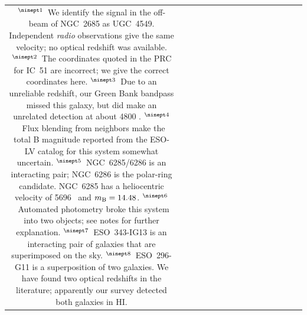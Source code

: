 \begin{tabular}{|c|l|ll|rr|lr|lr|r|rl|c|rr|}
{{$^{\ninept 1}$\ We identify the signal in the off-beam of NGC~2685 as  
	UGC~4549.  Independent {\it radio\/} observations give the 
	same velocity; no optical redshift was available.  \hfil\break
$^{\ninept 2}$\ The coordinates quoted in the PRC for IC~51 are incorrect; 
      we give the correct coordinates here.\hfil\break
$^{\ninept 3}$\ Due to an unreliable redshift, our Green Bank bandpass 
	missed this galaxy, but did make an unrelated detection at 
	about 4800 \KMS.  
	\hfil\break
$^{\ninept 4}$\ Flux blending from neighbors make the total B magnitude 
	reported from the ESO-LV catalog for this system somewhat uncertain.  
	\hfil\break
$^{\ninept 5}$\ NGC~6285/6286 is an interacting pair; NGC~6286 is the 
	polar-ring candidate.  NGC~6285 has a heliocentric velocity of 
	5696 \KMS\ and $m_{\rm B} = 14.48$.   \hfil\break
$^{\ninept 6}$\ Automated photometry broke this system into two objects; 
	see notes for further explanation.\hfil\break
$^{\ninept 7}$\ ESO~343-IG13 is an interacting pair of galaxies that are 
	superimposed on the sky.\hfil\break
$^{\ninept 8}$\ ESO~296-G11 is a superposition of two galaxies.  We have 
      found two optical redshifts in the literature; apparently our survey 
      detected both galaxies in HI.\hfil\break
}}
\end{tabular}
\clearpage

